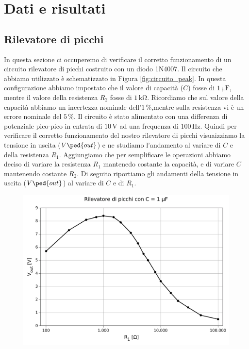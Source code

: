\section*{Dati e risultati}

\subsection{Rilevatore di picchi}

In questa sezione ci occuperemo di verificare il corretto funzionamento di un circuito rilevatore di picchi costruito con un diodo 1N4007.
Il circuito che abbiamo utilizzato è schematizzato in Figura \ref{fig:circuito_peak}.
In questa configurazione abbiamo impostato che il valore di capacità ($C$) fosse di $1\,\si{\micro\farad}$, mentre il valore della resistenza $R_2$ fosse di $1\,\si{\kilo\ohm}$. Ricordiamo che sul valore della capacità abbiamo un incertezza nominale dell'$1\,\%$,mentre sulla resistenza vi è un errore nominale del $5\,\%$.
Il circuito è stato alimentato con una differenza di potenziale pico-pico in entrata di $10\,\si{\volt}$ ad una frequenza di $100\,\si{\hertz}$.
Quindi per verificare il corretto funzionamento del nostro rilevatore di picchi visuaizziamo la tensione in uscita ($V\ped{out}$) e ne studiamo l'andamento al variare di $C$ e della resistenza $R_1$.
Aggiungiamo che per semplificare le operazioni abbiamo deciso di variare la resistenza $R_1$ mantenedo costante la capacità, e di variare $C$ mantenendo costante $R_2$.
Di seguito riportiamo gli andamenti della tensione in uscita ($V\ped{out}$) al variare di $C$ e di $R_1$.

\begin{figure}
    \includegraphics[scale=0.7]{capacita.pdf}
    \caption{}
    \label{fig:capacita}
\end{figure}


